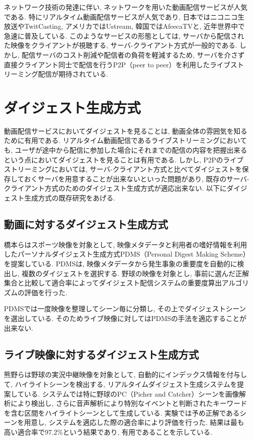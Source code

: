 ネットワーク技術の発達に伴い, ネットワークを用いた動画配信サービスが人気である. 特にリアルタイム動画配信サービスが人気であり, 日本ではニコニコ生放送\cite{nico}やTwitCasting\cite{twi}, アメリカではUstream\cite{ust}, 韓国ではAfeecaTV\cite{afr}と, 近年世界中で急速に普及している.  このようなサービスの形態としては, サーバから配信された映像をクライアントが視聴する, サーバ-クライアント方式が一般的である. しかし, 配信サーバのコスト削減や配信者の負荷を軽減するため, サーバを介さず直接クライアント同士で配信を行うP2P（peer to peer）を利用したライブストリーミング配信が期待されている.

\section{ダイジェスト生成方式}
動画配信サービスにおいてダイジェストを見ることは, 動画全体の雰囲気を知るために有用である. リアルタイム動画配信であるライブストリーミングにおいても, ユーザが途中から配信に参加した場合にそれまでの配信の内容を把握出来るという点においてダイジェストを見ることは有用である. しかし, P2Pのライブストリーミングにおいては, サーバ-クライアント方式と比べてダイジェストを保存しておくサーバを用意することが出来ないといった問題があり, 既存のサーバ-クライアント方式のためのダイジェスト生成方式が適応出来ない. 以下にダイジェスト生成方式の既存研究をあげる.

\subsection{動画に対するダイジェスト生成方式}
橋本らはスポーツ映像を対象として, 映像メタデータと利用者の嗜好情報を利用したパーソナルダイジェスト生成方式PDMS（Personal Digest Making Scheme）\cite{pdms}を提案している. PDMSは, 映像メタデータから発生事象の重要度を自動的に検出し, 複数のダイジェストを選択する. 野球の映像を対象とし, 事前に選んだ正解集合と比較して適合率によってダイジェスト配信システムの重要度算出アルゴリズムの評価を行った.

PDMSでは一度映像を整理してシーン毎に分類し, その上でダイジェストシーンを選出している. そのためライブ映像に対してはPDMSの手法を適応することが出来ない.

\subsection{ライブ映像に対するダイジェスト生成方式}
熊野らは野球の実況中継映像を対象として, 自動的にインデックス情報を付与して, ハイライトシーンを検出する, リアルタイムダイジェスト生成システム\cite{yakyu}を提案している. システムでは特に野球のPC（Picher and Catcher）シーンを画像解析により検出し, さらに音声解析により特別なイベントと判断されたキーワードを含む区間をハイライトシーンとして生成している. 実験では予め正解であるシーンを用意し, システムを適応した際の適合率により評価を行った. 結果は最も高い適合率で97.2\%という結果であり, 有用であることを示している.

